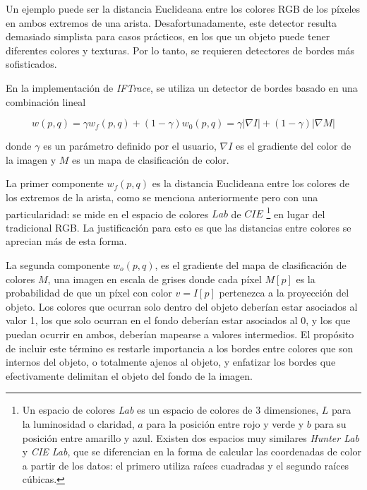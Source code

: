 \documentclass[a4paper,10pt]{article}
\begin{document}
Un ejemplo puede ser la distancia Euclideana entre los colores RGB de los píxeles
en ambos extremos de una arista. Desafortunadamente, este detector resulta demasiado
simplista para casos prácticos, en los que un objeto puede tener diferentes colores y
texturas. Por lo tanto, se requieren detectores de bordes más sofisticados.

En la implementación de \textit{IFTrace}, se utiliza un detector de bordes basado en
una combinación lineal

\begin{equation}
   \label{eq:IFTrace-edge-detector}
   w(p,q) = \gamma w_{f}(p,q) + (1 - \gamma)w_{0}(p,q) = \gamma |\nabla I| + (1 - \gamma)|\nabla M|
\end{equation}

donde $\gamma$ es un parámetro definido por el usuario, $\nabla I$ es el gradiente
del color de la imagen y $M$ es un mapa de clasificación de color.

La primer componente $w_{f}(p,q)$ es la distancia Euclideana entre los colores
de los extremos de la arista, como se menciona anteriormente pero con una
particularidad: se mide en el espacio de colores $Lab$ de $CIE$ \footnote{ Un
  espacio de colores \textit{Lab} es un espacio de colores de 3 dimensiones,
  $L$ para la luminosidad o claridad, $a$ para la posición entre rojo y verde y
  $b$ para su posición entre amarillo y azul. Existen dos espacios muy similares
  \textit{Hunter Lab} y \textit{CIE Lab}, que se diferencian en la forma de
  calcular las coordenadas de color a partir de los datos: el primero utiliza
  raíces cuadradas y el segundo raíces cúbicas.} en lugar del tradicional RGB.
La justificación para esto es que las distancias entre colores se aprecian
más de esta forma. %

La segunda componente $w_{o}(p,q)$, es el gradiente del mapa de clasificación
de colores $M$, una imagen en escala de grises donde cada píxel $M[p]$ es
la probabilidad de que un píxel con color $v=I[p]$ pertenezca a la proyección
del objeto. Los colores que ocurran solo dentro del objeto deberían estar
asociados al valor 1, los que solo ocurran en el fondo deberían estar
asociados al 0, y los que puedan ocurrir en ambos, deberían mapearse a
valores intermedios. El propósito de incluir este término es restarle
importancia a los bordes entre colores que son internos del objeto, o
totalmente ajenos al objeto, y enfatizar los bordes que efectivamente
delimitan el objeto del fondo de la imagen.
\end{document}
